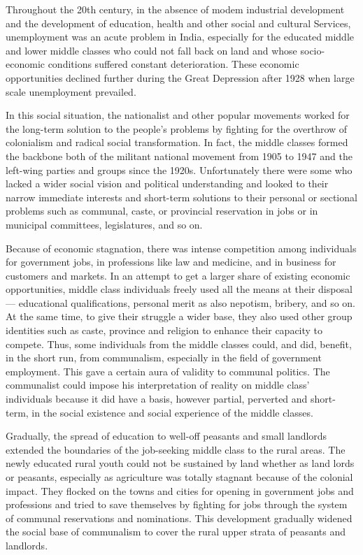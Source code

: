 \begin{multicols}{2}
Throughout the 20th century, in the absence of modem industrial development and the development of education, health and other social and cultural Services, unemployment was an acute problem in India, especially for the educated middle and lower middle classes who could not fall back on land and whose socio-economic conditions suffered constant deterioration. These economic opportunities declined further during the Great Depression after 1928 when large scale unemployment prevailed. 

In this social situation, the nationalist and other popular movements worked for the long-term solution to the people's problems by fighting for the overthrow of colonialism and radical social transformation. In fact, the middle classes formed the backbone both of the militant national movement from 1905 to 1947 and the left-wing parties and groups since the 1920s. Unfortunately there were some who lacked a wider social vision and political understanding and looked to their narrow immediate interests and short-term solutions to their personal or sectional problems such as communal, caste, or provincial reservation in jobs or in municipal committees, legislatures, and so on. 

Because of economic stagnation, there was intense competition among individuals for government jobs, in professions like law and medicine, and in business for customers and markets. In an attempt to get a larger share of existing economic opportunities, middle class individuals freely used all the means at their disposal --- educational qualifications, personal merit as also nepotism, bribery, and so on. At the same time, to give their struggle a wider base, they also used other group identities such as caste, province and religion to enhance their capacity to compete. Thus, some individuals from the middle classes could, and did, benefit, in the short run, from communalism, especially in the field of government employment. This gave a certain aura of validity to communal politics. The communalist could impose his interpretation of reality on middle class' individuals because it did have a basis, however partial, perverted and short-term, in the social existence and social experience of the middle classes. 

Gradually, the spread of education to well-off peasants and small landlords extended the boundaries of the job-seeking middle class to the rural areas. The newly educated rural youth could not be sustained by land whether as land lords or peasants, especially as agriculture was totally stagnant because of the colonial impact. They flocked on the towns and cities for opening in government jobs and professions and tried to save themselves by fighting for jobs through the system of communal reservations and nominations. This development gradually widened the social base of communalism to cover the rural upper strata of peasants and landlords. 


\end{multicols}
